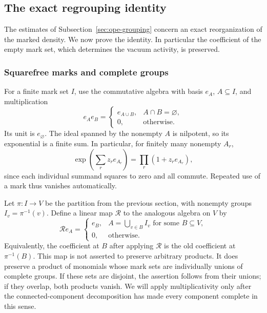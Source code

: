 \subsection{The exact regrouping identity}
\label{sec:ope-grouping-algebra}
The estimates of Subsection~\ref{sec:ope-grouping} concern an exact
reorganization of the marked density. We now prove the identity. In
particular the coefficient of the empty mark set, which determines
the vacuum activity, is preserved.

\subsubsection{Squarefree marks and complete groups}
For a finite mark set $I$, use the commutative algebra with basis
$e_A$, $A\subseteq I$, and multiplication
\[
 e_Ae_B=\begin{cases}e_{A\cup B},&A\cap B=\varnothing,\\0,&\text{otherwise}.
 \end{cases}
\]
Its unit is $e_\varnothing$. The ideal spanned by the nonempty
$A$ is nilpotent, so its exponential is a finite sum. In particular,
for finitely many nonempty $A_r$,
\[
 \exp\left(\sum_r z_re_{A_r}\right)
       =\prod_r(1+z_re_{A_r}),
\]
since each individual summand squares to zero and all commute.
Repeated use of a mark thus vanishes automatically.

Let $\pi:I\to V$ be the partition from the previous section, with
nonempty groups $I_v=\pi^{-1}(v)$. Define a linear map
$\mathcal R$ to the analogous algebra on $V$ by
\[
 \mathcal R e_A=
 \begin{cases}e_B,&A=\bigcup_{v\in B}I_v\text{ for some }B\subseteq V,\\
 0,&\text{otherwise}.
 \end{cases}
\]
Equivalently, the coefficient at $B$ after applying $\mathcal R$
is the old coefficient at $\pi^{-1}(B)$. This map is not asserted
to preserve arbitrary products. It does preserve a product of
monomials whose mark sets are individually unions of complete groups.
If these sets are disjoint, the assertion follows from their unions;
if they overlap, both products vanish. We will apply multiplicativity
only after the connected-component decomposition has made every
component complete in this sense.

